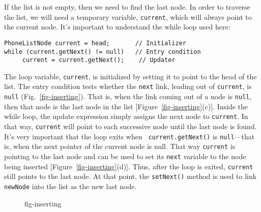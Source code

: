 If the list is not empty, then we need to find the last node.  In order
to traverse the list, we will need a temporary variable,
{\tt current}, which will always point to the current node.   It's important
to understand the while loop used here:

\begin{jjjlisting}
\begin{lstlisting}
PhoneListNode current = head;       // Initializer
while (current.getNext() != null)   // Entry condition
     current = current.getNext();    // Updater
\end{lstlisting}
\end{jjjlisting}



\noindent The loop variable, {\tt current}, is initialized by
setting it to point to the head of the list.  The entry condition
tests whether the {\tt next} link, leading out of {\tt current}, is
{\tt null} (Fig.~\ref{fig-inserting}). That is, when the link coming
out of a node is {\tt null}, then that node is the last node in the
list [Figure~\ref{fig-inserting}(c)]. Inside the while loop, the
update expression simply assigns the next node to {\tt current}. In
that way, {\tt current} will point to each successive node until the
last node is found.  It's very important that the loop exits when {\tt
current.getNext()} is {\tt null}---that is, when the next pointer of
the current node is null.  That way {\tt current} is pointing to
the last node and can be used to set its {\tt next} variable to the
node being inserted [Figure~\ref{fig-inserting}(d)].  Thus, after the
loop is exited, {\tt current} still points to the last node.  At that
point, the {\tt setNext()} method is used to link {\tt newNode} into
the list as the new last node.

\begin{figure}[tbh]
{fig-inserting}
\end{figure}


